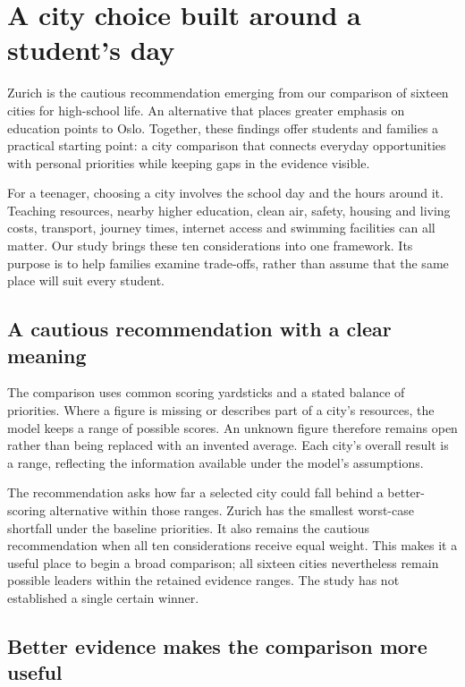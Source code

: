 \section*{A city choice built around a student's day}

Zurich is the cautious recommendation emerging from our comparison of sixteen cities for high-school life. An alternative that places greater emphasis on education points to Oslo. Together, these findings offer students and families a practical starting point: a city comparison that connects everyday opportunities with personal priorities while keeping gaps in the evidence visible.

For a teenager, choosing a city involves the school day and the hours around it. Teaching resources, nearby higher education, clean air, safety, housing and living costs, transport, journey times, internet access and swimming facilities can all matter. Our study brings these ten considerations into one framework. Its purpose is to help families examine trade-offs, rather than assume that the same place will suit every student.

\subsection*{A cautious recommendation with a clear meaning}

The comparison uses common scoring yardsticks and a stated balance of priorities. Where a figure is missing or describes part of a city's resources, the model keeps a range of possible scores. An unknown figure therefore remains open rather than being replaced with an invented average. Each city's overall result is a range, reflecting the information available under the model's assumptions.

The recommendation asks how far a selected city could fall behind a better-scoring alternative within those ranges. Zurich has the smallest worst-case shortfall under the baseline priorities. It also remains the cautious recommendation when all ten considerations receive equal weight. This makes it a useful place to begin a broad comparison; all sixteen cities nevertheless remain possible leaders within the retained evidence ranges. The study has not established a single certain winner.

\subsection*{Better evidence makes the comparison more useful}

